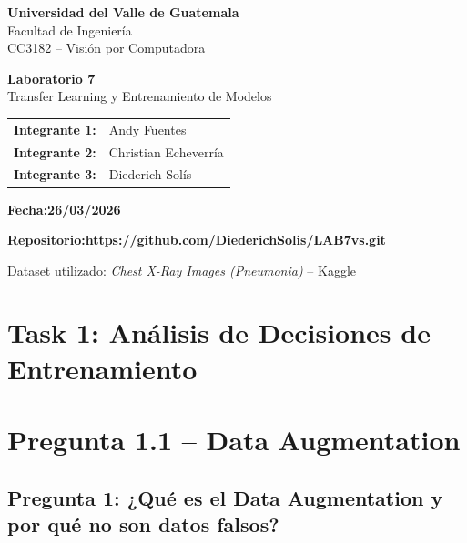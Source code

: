 \documentclass[12pt, letterpaper]{article}
\begin{document}
\begin{titlepage}
    \centering
    \vspace*{1cm}

    {\large \textbf{Universidad del Valle de Guatemala}\\
    Facultad de Ingeniería\\
    CC3182 -- Visión por Computadora}

    \vspace{2cm}

    {\Huge \textbf{Laboratorio 7}}\\[0.5cm]
    {\Large Transfer Learning y Entrenamiento de Modelos}

    \vspace{2cm}

    \begin{tabular}{ll}
        \textbf{Integrante 1:} & Andy Fuentes \\[4pt]
        \textbf{Integrante 2:} & Christian Echeverría \\[4pt]
        \textbf{Integrante 3:} & Diederich Solís \\
    \end{tabular}

    \vspace{1.5cm}

    \textbf{Fecha:26/03/2026} \
    
    \textbf{Repositorio:https://github.com/DiederichSolis/LAB7vs.git} \

    \vfill

    {\small Dataset utilizado: \textit{Chest X-Ray Images (Pneumonia)} -- Kaggle}
\end{titlepage}

\section*{\LARGE Task 1: Análisis de Decisiones de Entrenamiento}

\noindent

\section{Pregunta 1.1 -- Data Augmentation}

\subsection{Pregunta 1: ¿Qué es el Data Augmentation y por qué no son datos falsos?}
\end{document}
